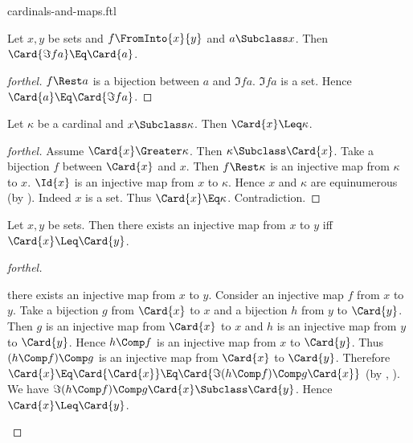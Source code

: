 \documentclass{stex}
\begin{document}
\begin{smodule}{cardinals-and-maps.ftl}



\begin{proposition*}[forthel,name=cardinality of image under injection]
  Let $x, y$ be sets and $f \FromInto{x}{y}$ and $a \Subclass x$.
  Then $\Card{\Im{f}{a}} \Eq \Card{a}$.
\end{proposition*}
\begin{proof}[forthel]
  $f \Rest a$ is a bijection between $a$ and $\Im{f}{a}$.
  $\Im{f}{a}$ is a set.
  Hence $\Card{a} \Eq \Card{\Im{f}{a}}$.
\end{proof}

\begin{proposition*}[forthel]
  Let $\kappa$ be a cardinal and $x \Subclass \kappa$.
  Then $\Card{x} \Leq \kappa$.
\end{proposition*}
\begin{proof}[forthel]
  Assume $\Card{x} \Greater \kappa$.
  Then $\kappa \Subclass \Card{x}$.
  Take a bijection $f$ between $\Card{x}$ and $x$.
  Then $f \Rest \kappa$ is an injective map from $\kappa$ to $x$.
  $\Id{x}$ is an injective map from $x$ to $\kappa$.
  Hence $x$ and $\kappa$ are equinumerous (by ).
  Indeed $x$ is a set.
  Thus $\Card{x} \Eq \kappa$.
  Contradiction.
\end{proof}

\begin{proposition*}[forthel,name=existence condition for injections]
  Let $x, y$ be sets.
  Then there exists an injective map from $x$ to $y$ iff $\Card{x} \Leq \Card{y}$.
\end{proposition*}
\begin{proof}[forthel]
  \begin{case}{there exists an injective map from $x$ to $y$.}
    Consider an injective map $f$ from $x$ to $y$.
    Take a bijection $g$ from $\Card{x}$ to $x$ and a bijection $h$ from $y$ to $\Card{y}$.
    Then $g$ is an injective map from $\Card{x}$ to $x$ and $h$ is an injective map from $y$ to $\Card{y}$.
    Hence $h \Comp f$ is an injective map from $x$ to $\Card{y}$.
    Thus $(h \Comp f) \Comp g$ is an injective map from $\Card{x}$ to $\Card{y}$.
    Therefore $\Card{x}
      \Eq \Card{\Card{x}}
      \Eq \Card{\Im{(h \Comp f) \Comp g}{\Card{x}}}$
    (by , ).
    We have $\Im{(h \Comp f) \Comp g}{\Card{x}} \Subclass \Card{y}$.
    Hence $\Card{x} \Leq \Card{y}$.
  \end{case}


\end{proof}
\end{smodule}
\end{document}
